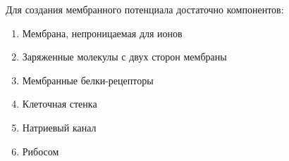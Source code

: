 
Для создания мембранного потенциала достаточно компонентов:

\begin{enumerate}
    \item Мембрана, непроницаемая для ионов
    \item Заряженные молекулы с двух сторон мембраны 
    \item Мембранные белки-рецепторы
    \item Клеточная стенка
    \item Натриевый канал
    \item Рибосом
\end{enumerate}

